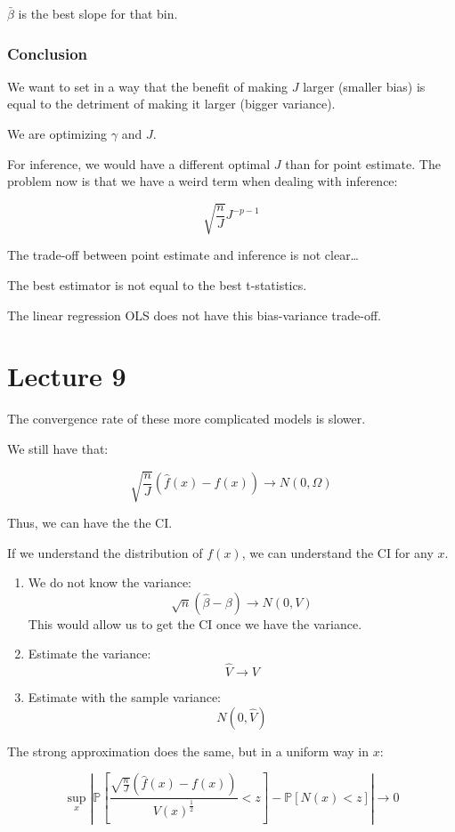 \documentclass{article}
\begin{document}
$\bar{\beta}$ is the best slope for that bin.

\subsubsection{Conclusion}
We want to set in a way that the benefit of making $J$ larger (smaller bias) is equal to the detriment of making it larger (bigger variance).

We are optimizing $\gamma$ and $J$.

For inference, we would have a different optimal $J$ than for point estimate. The problem now is that we have a weird term when dealing with inference:

$$
\sqrt{\frac{n}{J}} J^{-p-1}
$$

The trade-off between point estimate and inference is not clear\dots

The best estimator is not equal to the best t-statistics.

The linear regression OLS does not have this bias-variance trade-off.

\section{Lecture 9}

The convergence rate of these more complicated models is slower.

We still have that:

$$
\sqrt{\frac{n}{J}} \left( \hat{f}(x) - f(x) \right) \to N(0, \Omega)
$$

Thus, we can have the the CI.

If we understand the distribution of $f(x)$, we can understand the CI for any $x$.

\begin{enumerate}
    \item We do not know the variance:
    $$
    \sqrt{n} \left( \hat{\beta} - \beta \right) \to N(0, V)
    $$
    This would allow us to get the CI once we have the variance.
    \item Estimate the variance:
    $$
    \hat{V} \to V
    $$
    \item Estimate with the sample variance:
    $$
    N (0, \hat{V})
    $$
\end{enumerate}

The strong approximation does the same, but in a uniform way in $x$:

$$
\sup_x \left|
    \mathbb{P} \left[
        \frac{\sqrt{\frac{n}{J}} (\hat{f}(x) - f(x))}{V(x)^{\frac{1}{2}}}
        < z
    \right]
    - \mathbb{P} \left[
        N(x) < z
    \right]
\right| \to 0
$$
\end{document}
